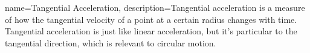 {
    name=Tangential Acceleration,
    description={Tangential acceleration is a measure of how the tangential velocity of a point at a certain radius changes with time. Tangential acceleration is just like linear acceleration, but it’s particular to the tangential direction, which is relevant to circular motion.}
}
